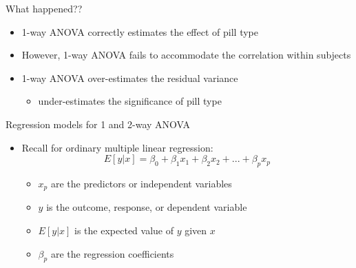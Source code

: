 \documentclass[
  ignorenonframetext,
]{beamer}
\providecommand{\tightlist}{%
  \setlength{\itemsep}{0pt}\setlength{\parskip}{0pt}}
\begin{document}
\begin{frame}{What happened??}
\protect\hypertarget{what-happened}{}

\begin{itemize}
\tightlist
\item
  1-way ANOVA correctly estimates the effect of pill type
\item
  However, 1-way ANOVA fails to accommodate the correlation within
  subjects
\item
  1-way ANOVA over-estimates the residual variance

  \begin{itemize}
  \tightlist
  \item
    under-estimates the significance of pill type
  \end{itemize}
\end{itemize}

\end{frame}

\begin{frame}{Regression models for 1 and 2-way ANOVA}
\protect\hypertarget{regression-models-for-1-and-2-way-anova}{}

\begin{itemize}
\tightlist
\item
  Recall for ordinary multiple linear regression: \begin{equation*}
  E[y|x] = \beta_0 + \beta_1 x_1 + \beta_2 x_2 + ... + \beta_p x_p
  \end{equation*}

  \begin{itemize}
  \tightlist
  \item
    \(x_p\) are the predictors or independent variables
  \item
    \(y\) is the outcome, response, or dependent variable
  \item
    \(E[y|x]\) is the expected value of \(y\) given \(x\)
  \item
    \(\beta_p\) are the regression coefficients
  \end{itemize}
\end{itemize}

\end{frame}
\end{document}
